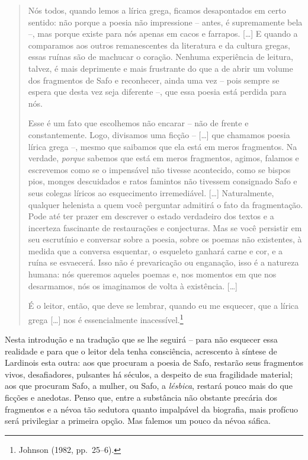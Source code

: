 \begin{quote}
Nós todos, quando lemos a lírica grega, ficamos desapontados em certo sentido:
não porque a poesia não impressione -- antes, é supremamente bela --, mas
porque existe para nós apenas em cacos e farrapos. [\ldots{}] E quando a comparamos
aos outros remanescentes da literatura e da cultura gregas, essas ruínas são de
machucar o coração. Nenhuma experiência de leitura, talvez, é mais deprimente e
mais frustrante do que a de abrir um volume dos fragmentos de Safo e
reconhecer, ainda uma vez -- pois sempre se espera que desta vez seja diferente
--, que essa poesia está perdida para nós.

Esse é um fato que escolhemos não encarar -- não de frente e constantemente.
Logo, divisamos uma ficção -- [\ldots{}] que chamamos poesia lírica grega --,
mesmo que saibamos que ela está em meros fragmentos. Na verdade,
\textit{porque} sabemos que está em meros fragmentos, agimos, falamos
e escrevemos como se o impensável não tivesse acontecido, como se bispos pios,
monges descuidados e ratos famintos não tivessem consignado Safo e seus colegas
líricos ao esquecimento irremediável. [\ldots{}] Naturalmente, qualquer helenista a
quem você perguntar admitirá o fato da fragmentação. Pode até ter prazer em
descrever o estado verdadeiro dos textos e a incerteza fascinante de
restaurações e conjecturas. Mas se você persistir em seu escrutínio e conversar
sobre a poesia, sobre os poemas não existentes, à medida que a conversa
esquentar, o esqueleto ganhará carne e cor, e a ruína se esvaecerá. Isso não é
prevaricação ou enganação, isso é a natureza humana: nós queremos aqueles
poemas e, nos momentos em que nos desarmamos, nós os imaginamos de volta à
existência. [\ldots{}]

É o leitor, então, que deve se lembrar, quando eu me esquecer, que a lírica
grega [\ldots{}] nos é essencialmente inacessível.\footnote{ Johnson (1982, pp.~25--6).}
\end{quote}

Nesta introdução e na tradução que se lhe seguirá --
para não esquecer essa realidade e para que o leitor dela tenha consciência,
acrescento à síntese de Lardinois esta outra: aos que procuram a poesia de
Safo, restarão seus fragmentos vivos, desafiadores, pulsantes há séculos, a
despeito de sua fragilidade material; aos que procuram Safo, a mulher, ou Safo,
a \textit{lésbica}, restará pouco mais do que ficções e anedotas. Penso que,
entre a substância não obstante precária dos fragmentos e a névoa tão sedutora
quanto impalpável da biografia, mais profícuo será privilegiar a primeira
opção. Mas falemos um pouco da névoa sáfica.


